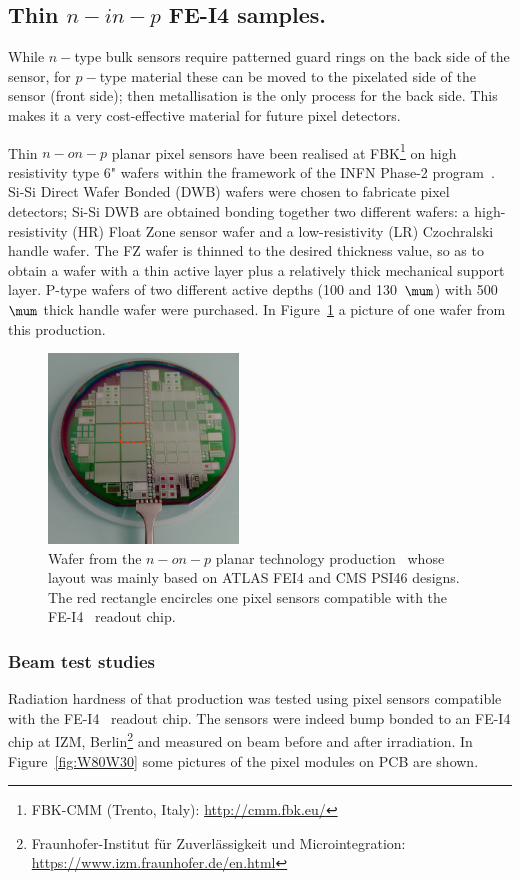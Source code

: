 \subsection{Thin $n-in-p$ FE-I4 samples.}
\label{sec:PAE2pixels}

While $n-$type bulk sensors require patterned guard rings on the back side of the sensor, for $p-$type material these can be moved to the pixelated side of the sensor (front side); then metallisation is the only process for the back side. This makes it a very cost-effective material for future pixel detectors. 

Thin $n-on-p$ planar pixel sensors have been realised at FBK\footnote{FBK-CMM (Trento, Italy): \url{http://cmm.fbk.eu/}} on high resistivity type 6" 
wafers within 
the  framework of the INFN Phase-2 program~\cite{DALLABETTA2016388}.
Si-Si Direct Wafer Bonded (DWB) wafers were chosen to fabricate pixel detectors;  Si-Si DWB  are obtained bonding together two different wafers: a high-resistivity (HR) Float Zone sensor wafer and a low-resistivity (LR) Czochralski handle wafer. The FZ wafer is thinned to the desired thickness value, so as to obtain a wafer with a thin active layer plus a relatively thick mechanical support layer. P-type wafers of two different active depths (100 and 130~$\mum$) with 500~$\mum$  thick handle wafer were purchased. 
In Figure~\ref{fig:wafer.png} a picture of one wafer from this production.
\begin{figure}[!htpb]
\centering
\includegraphics[width=0.45\textwidth]{wafer.png}
\caption{\label{fig:wafer.png} Wafer from the $n-on-p$ planar technology production~\cite{DALLABETTA2016388}  whose layout was mainly based on ATLAS FEI4 and CMS PSI46 designs. The red rectangle 
encircles one pixel sensors compatible with the FE-I4~\cite{FEI4} 
readout chip.}
\end{figure}

\subsubsection{Beam test studies}
Radiation hardness of that production was tested  using pixel sensors compatible with the FE-I4~\cite{FEI4} 
readout chip. The sensors were indeed bump bonded to an FE-I4 chip at IZM, 
Berlin\footnote{Fraunhofer-Institut f\"ur Zuverl\"assigkeit und Microintegration: \url{https://www.izm.fraunhofer.de/en.html}} and measured 
on beam before and after irradiation. In Figure~\ref{fig:W80W30} some pictures of the pixel modules on 
PCB are shown. 

